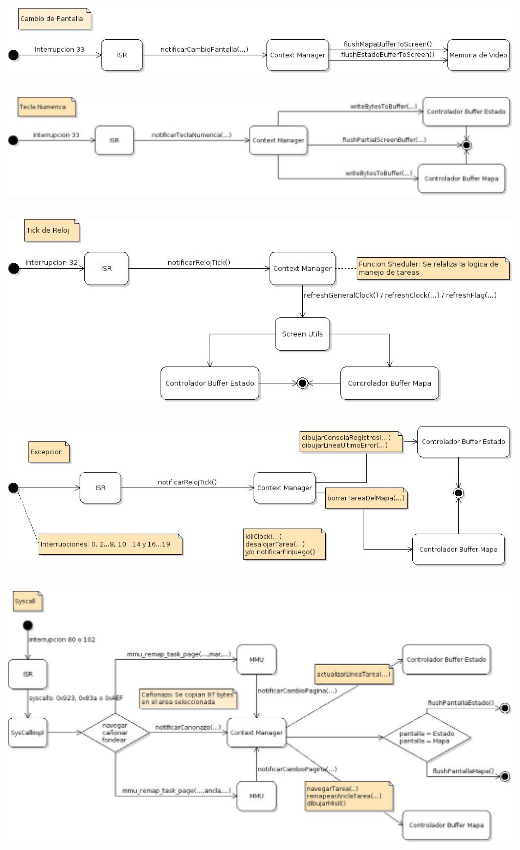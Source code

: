 \includegraphics[scale=0.4]{diagramas/cambioPantalla-handler.jpg}
\\\\
\includegraphics[scale=0.4]{diagramas/teclaNumerica-handler.jpg}
\\\\
\includegraphics[scale=0.4]{diagramas/tickReloj-handler.jpg}
\\\\
\includegraphics[scale=0.4]{diagramas/excepcion-handler.jpg}
\\\\
\includegraphics[scale=0.4]{diagramas/syscall-handler.jpg}
\\\\




